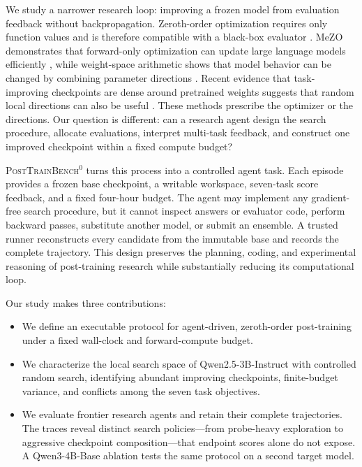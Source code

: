 \documentclass{article}
\newcommand{\bench}{\textsc{PostTrainBench}$^{0}$}
\begin{document}
We study a narrower research loop: improving a frozen model from evaluation feedback
without backpropagation. Zeroth-order optimization requires only function values and is
therefore compatible with a black-box evaluator \citep{liu2020primer}. MeZO demonstrates
that forward-only optimization can update large language models efficiently
\citep{malladi2023mezo}, while weight-space arithmetic shows that model behavior can be
changed by combining parameter directions \citep{ilharco2022taskarithmetic}. Recent
evidence that task-improving checkpoints are dense around pretrained weights suggests that
random local directions can also be useful \citep{gan2026neuralthickets}. These methods
prescribe the optimizer or the directions. Our question is different: can a research agent
design the search procedure, allocate evaluations, interpret multi-task feedback, and
construct one improved checkpoint within a fixed compute budget?

\bench{} turns this process into a controlled agent task. Each episode provides a frozen
base checkpoint, a writable workspace, seven-task score feedback, and a fixed four-hour
budget. The agent may implement any gradient-free search procedure, but it cannot inspect
answers or evaluator code, perform backward passes, substitute another model, or submit an
ensemble. A trusted runner reconstructs every candidate from the immutable base and records
the complete trajectory. This design preserves the planning, coding, and experimental
reasoning of post-training research while substantially reducing its computational loop.

Our study makes three contributions:
\begin{itemize}
    \item We define an executable protocol for agent-driven,
    zeroth-order post-training under a fixed wall-clock and forward-compute budget.
    \item We characterize the local search space of Qwen2.5-3B-Instruct with controlled
    random search, identifying abundant improving checkpoints, finite-budget variance, and
    conflicts among the seven task objectives.
    \item We evaluate frontier research agents and retain their complete trajectories.
    The traces reveal distinct search policies---from probe-heavy exploration to aggressive
    checkpoint composition---that endpoint scores alone do not expose. A Qwen3-4B-Base
    ablation tests the same protocol on a second target model.
\end{itemize}
\end{document}
